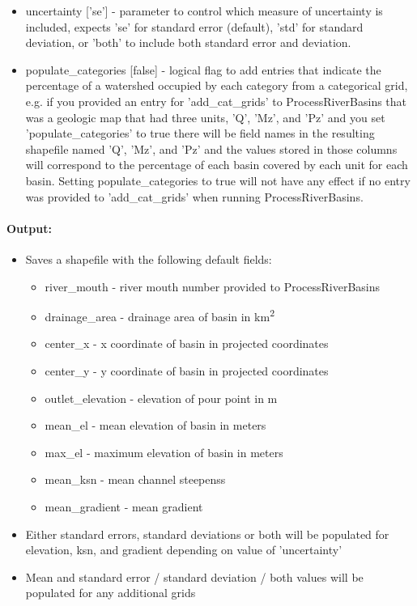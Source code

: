 \begin{itemize}
\item uncertainty ['se'] - parameter to control which measure of uncertainty is included, expects 'se' for standard error (default), 'std' for standard deviation, or 'both'
to include both standard error and deviation.
\item populate\_categories [false] - logical flag to add entries that indicate the percentage of a watershed occupied by each category from a categorical grid, e.g. if you
provided an entry for 'add\_cat\_grids' to ProcessRiverBasins that was a geologic map that had three units, 'Q', 'Mz', and 'Pz' and you set 'populate\_categories' 
to true there will be field names in the resulting shapefile named 'Q', 'Mz', and 'Pz' and the values stored in those columns will correspond to the percentage 
of each basin covered by each unit for each basin. Setting populate\_categories to true will not have any effect if no entry was provided to 'add\_cat\_grids' when
running ProcessRiverBasins.
\end{itemize}

\paragraph{Output:}
\begin{itemize}
\item Saves a shapefile with the following default fields:
\begin{itemize}
\item river\_mouth - river mouth number provided to ProcessRiverBasins
\item drainage\_area - drainage area of basin in km\textsuperscript{2}
\item center\_x - x coordinate of basin in projected coordinates
\item center\_y - y coordinate of basin in projected coordinates
\item outlet\_elevation - elevation of pour point in m
\item mean\_el - mean elevation of basin in meters
\item max\_el - maximum elevation of basin in meters
\item mean\_ksn - mean channel steepenss
\item mean\_gradient - mean gradient
\end{itemize}
\item Either standard errors, standard deviations or both will be populated for elevation, ksn, and gradient depending on value of 'uncertainty'
\item Mean and standard error / standard deviation / both values will be populated for any additional grids
\end{itemize}

